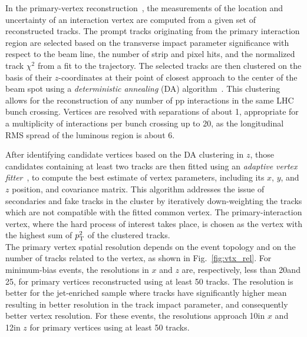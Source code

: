 In the primary-vertex reconstruction~\cite{Speer:927395}, the measurements of the location and uncertainty of an interaction vertex are computed from a given set of reconstructed tracks. The prompt tracks originating from the primary interaction region are selected based on the transverse impact parameter significance with respect to the beam line, the number of strip and pixel hits, and the normalized track $\chi^2$ from a fit to the trajectory. The selected tracks are then clustered on the basis of their $z$-coordinates at their point of closest approach to the center of the beam spot using a \textit{deterministic annealing} (DA) algorithm~\cite{726788}.
This clustering allows for the reconstruction of any number of pp interactions in the same LHC bunch crossing. Vertices are resolved with separations of about 1\mm, appropriate for a multiplicity of interactions per bunch crossing up to 20, as the longitudinal RMS spread of the luminous region is about 6\cm.

After identifying candidate vertices based on the DA clustering in $z$, those candidates containing at least two tracks are then fitted using an \textit{adaptive vertex fitter}~\cite{0954-3899-34-12-N01}, to compute the best
estimate of vertex parameters, including its $x$, $y$, and $z$ position, and covariance matrix. This algorithm addresses the issue of secondaries and fake tracks in the cluster by iteratively down-weighting the tracks which are not compatible with the fitted common vertex. The primary-interaction vertex, where the hard process of interest takes place, is chosen as the vertex with the highest sum of $p_{\mathrm{T}}^2$ of the clustered tracks.\\

The primary vertex spatial resolution depends on the event topology and on the number of tracks related to the vertex, as shown in Fig.~\ref{fig:vtx_rel}. For minimum-bias events, the resolutions in $x$ and $z$ are, respectively, less than 20\mum and 25\mum, for primary vertices reconstructed using at least 50 tracks. The resolution is better for the jet-enriched sample where tracks have significantly higher mean \pt resulting in better resolution in the track impact parameter, and consequently better vertex resolution. For these events, the resolutions approach 10\mum in $x$ and 12\mum in $z$ for primary vertices using at least 50 tracks.\\

